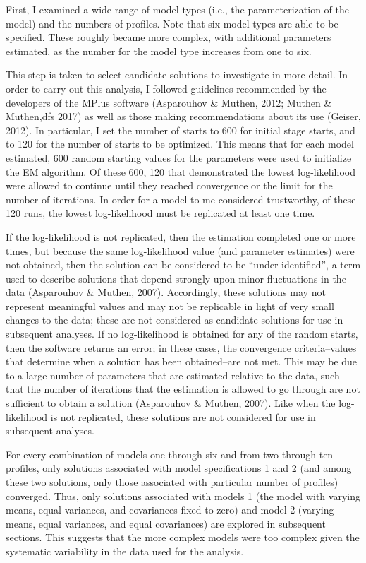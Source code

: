 \documentclass[]{msu-thesis}
\theoremstyle{definition}
\theoremstyle{definition}
\theoremstyle{definition}
\theoremstyle{remark}
\begin{document}
First, I examined a wide range of model types (i.e., the
parameterization of the model) and the numbers of profiles. Note that
six model types are able to be specified. These roughly became more
complex, with additional parameters estimated, as the number for the
model type increases from one to six.

This step is taken to select candidate solutions to investigate in more
detail. In order to carry out this analysis, I followed guidelines
recommended by the developers of the MPlus software (Asparouhov \&
Muthen, 2012; Muthen \& Muthen,dfs 2017) as well as those making
recommendations about its use (Geiser, 2012). In particular, I set the
number of starts to 600 for initial stage starts, and to 120 for the
number of starts to be optimized. This means that for each model
estimated, 600 random starting values for the parameters were used to
initialize the EM algorithm. Of these 600, 120 that demonstrated the
lowest log-likelihood were allowed to continue until they reached
convergence or the limit for the number of iterations. In order for a
model to me considered trustworthy, of these 120 runs, the lowest
log-likelihood must be replicated at least one time.

If the log-likelihood is not replicated, then the estimation completed
one or more times, but because the same log-likelihood value (and
parameter estimates) were not obtained, then the solution can be
considered to be ``under-identified'', a term used to describe solutions
that depend strongly upon minor fluctuations in the data (Asparouhov \&
Muthen, 2007). Accordingly, these solutions may not represent meaningful
values and may not be replicable in light of very small changes to the
data; these are not considered as candidate solutions for use in
subsequent analyses. If no log-likelihood is obtained for any of the
random starts, then the software returns an error; in these cases, the
convergence criteria--values that determine when a solution has been
obtained--are not met. This may be due to a large number of parameters
that are estimated relative to the data, such that the number of
iterations that the estimation is allowed to go through are not
sufficient to obtain a solution (Asparouhov \& Muthen, 2007). Like when
the log-likelihood is not replicated, these solutions are not considered
for use in subsequent analyses.

For every combination of models one through six and from two through ten
profiles, only solutions associated with model specifications 1 and 2
(and among these two solutions, only those associated with particular
number of profiles) converged. Thus, only solutions associated with
models 1 (the model with varying means, equal variances, and covariances
fixed to zero) and model 2 (varying means, equal variances, and equal
covariances) are explored in subsequent sections. This suggests that the
more complex models were too complex given the systematic variability in
the data used for the analysis.
\end{document}
